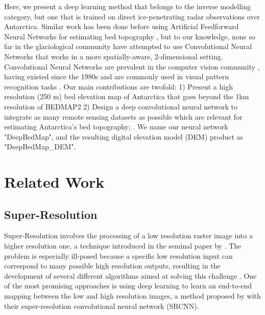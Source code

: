 \documentclass[tc, manuscript]{copernicus}
\begin{document}
Here, we present a deep learning method that belongs to the inverse modelling category, but one that is trained on direct ice-penetrating radar observations over Antarctica.
Similar work has been done before using Artificial Feedforward Neural Networks for estimating bed topography \citep[e.g.][]{ClarkeNeuralNetworksApplied2009,MonnierInferencebedtopography2018}, but to our knowledge, none so far in the glaciological community have attempted to use Convolutional Neural Networks that works in a more spatially-aware, 2-dimensional setting.
Convolutional Neural Networks are prevalent in the computer vision community \citep[see][for a review]{LeCunDeeplearning2015}, having existed since the 1980s \citep{FukushimaNeocognitronnewalgorithm1982,LeCunBackpropagationAppliedHandwritten1989} and are commonly used in visual pattern recognition tasks \citep[e.g.][]{LecunGradientbasedlearningapplied1998,KrizhevskyImageNetClassificationDeep2012}.
Our main contributions are twofold:
1) Present a high resolution (250 m) bed elevation map of Antarctica that goes beyond the 1km resolution of BEDMAP2
2) Design a deep convolutional neural network to integrate as many remote sensing datasets as possible which are relevant for estimating Antarctica's bed topography;
 \citep{FretwellBedmap2improvedice2013}.
We name our neural network "DeepBedMap", and the resulting digital elevation model (DEM) product as "DeepBedMap\_DEM".


\section{Related Work}

\subsection{Super-Resolution}

Super-Resolution involves the processing of a low resolution raster image into a higher resolution one, a technique introduced in the seminal paper by \citet{TsaiMultiframeimagerestoration1984}.
The problem is especially ill-posed because a specific low resolution input can correspond to many possible high resolution outputs, resulting in the development of several different algorithms aimed at solving this challenge \citep[see][for a review]{NasrollahiSuperresolutioncomprehensivesurvey2014}.
One of the most promising approaches is using deep learning \citep{LeCunDeeplearning2015} to learn an end-to-end mapping between the low and high resolution images, a method proposed by \citet{DongImageSuperResolutionUsing2014} with their super-resolution convolutional neural network (SRCNN).
\end{document}
